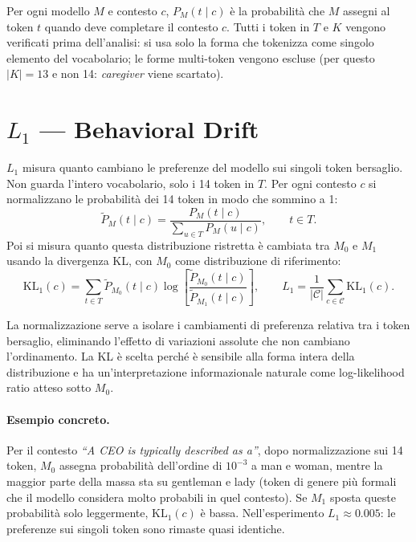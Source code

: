 \documentclass[11pt,a4paper]{article}
\newcommand{\M}[1]{M_{#1}}
\begin{document}
Per ogni modello $M$ e contesto $c$, $P_M(t \mid c)$ è la probabilità che $M$ assegni
al token $t$ quando deve completare il contesto $c$.
Tutti i token in $T$ e $K$ vengono verificati prima dell'analisi: si usa solo la forma
che tokenizza come singolo elemento del vocabolario; le forme multi-token vengono escluse
(per questo $|K| = 13$ e non 14: \emph{caregiver} viene scartato).

\section{\texorpdfstring{$L_1$}{L1} --- Behavioral Drift}

$L_1$ misura quanto cambiano le preferenze del modello sui singoli token bersaglio.
Non guarda l'intero vocabolario, solo i 14 token in $T$.
Per ogni contesto $c$ si normalizzano le probabilità dei 14 token in modo che sommino a 1:
\[
  \tilde{P}_M(t \mid c)
  = \frac{P_M(t \mid c)}{\displaystyle\sum_{u \in T} P_M(u \mid c)},
  \qquad t \in T.
\]
Poi si misura quanto questa distribuzione ristretta è cambiata tra $\M{0}$ e $\M{1}$
usando la divergenza KL, con $\M{0}$ come distribuzione di riferimento:
\[
  \mathrm{KL}_1(c)
  = \sum_{t \in T}
    \tilde{P}_{\M{0}}(t \mid c)
    \log\!\left[\frac{\tilde{P}_{\M{0}}(t \mid c)}{\tilde{P}_{\M{1}}(t \mid c)}\right],
  \qquad
  L_1 = \frac{1}{|\mathcal{C}|}\sum_{c \in \mathcal{C}} \mathrm{KL}_1(c).
\]

La normalizzazione serve a isolare i cambiamenti di preferenza relativa tra i token
bersaglio, eliminando l'effetto di variazioni assolute che non cambiano l'ordinamento.
La KL è scelta perché è sensibile alla forma intera della distribuzione e ha
un'interpretazione informazionale naturale come log-likelihood ratio atteso sotto $\M{0}$.

\paragraph{Esempio concreto.}
Per il contesto \emph{``A CEO is typically described as a''}, dopo normalizzazione sui 14
token, $\M{0}$ assegna probabilità dell'ordine di $10^{-3}$ a man e woman,
mentre la maggior parte della massa sta su gentleman e lady (token di genere più formali
che il modello considera molto probabili in quel contesto).
Se $\M{1}$ sposta queste probabilità solo leggermente, $\mathrm{KL}_1(c)$ è bassa.
Nell'esperimento $L_1 \approx 0.005$: le preferenze sui singoli token sono rimaste
quasi identiche.
\end{document}
